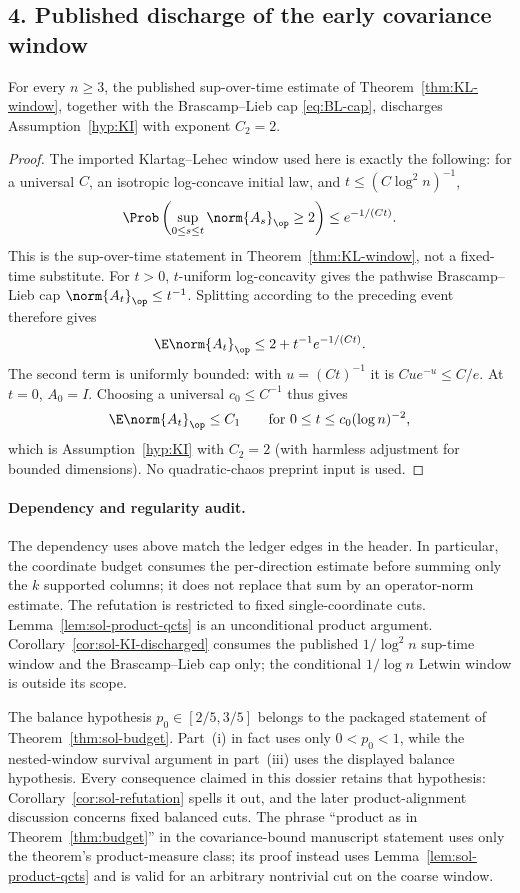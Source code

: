 \documentclass[../main.tex]{subfiles}
\begin{document}
\subsection*{4. Published discharge of the early covariance window}

\begin{corollary}[= Corollary~\ref{cor:KI-discharged}]
\label{cor:sol-KI-discharged}
For every $n\ge3$, the published sup-over-time estimate of
Theorem~\ref{thm:KL-window}, together with the Brascamp--Lieb cap \eqref{eq:BL-cap}, discharges
Assumption~\ref{hyp:KI} with exponent $C_2=2$.
\end{corollary}

\begin{proof}
The imported Klartag--Lehec window \cite[Thm.~61]{KLnotes} used here is exactly the following:
for a universal $C$, an
isotropic log-concave initial law, and
$t\le(C\log^2n)^{-1}$,
\[
  \Prob\left(\sup_{0\le s\le t}\norm{A_s}_\op\ge2\right)
  \le e^{-1/(Ct)}.
\]
This is the sup-over-time statement in Theorem~\ref{thm:KL-window}, not a fixed-time substitute.
For $t>0$, $t$-uniform log-concavity gives the pathwise Brascamp--Lieb cap
$\norm{A_t}_\op\le t^{-1}$.  Splitting according to the preceding event therefore gives
\[
  \E\norm{A_t}_\op
  \le2+t^{-1}e^{-1/(Ct)}.
\]
The second term is uniformly bounded: with $u=(Ct)^{-1}$ it is
$Cu e^{-u}\le C/e$.  At $t=0$, $A_0=I$.  Choosing a universal
$c_0\le C^{-1}$ thus gives
\[
  \E\norm{A_t}_\op\le C_1
  \qquad\text{for }0\le t\le c_0(\log n)^{-2},
\]
which is Assumption~\ref{hyp:KI} with $C_2=2$ (with harmless adjustment for bounded dimensions).
No quadratic-chaos preprint input is used.
\end{proof}

\paragraph{Dependency and regularity audit.}
The dependency uses above match the ledger edges in the header.  In particular, the coordinate
budget consumes the per-direction estimate before summing only the $k$ supported columns; it
does not replace that sum by an operator-norm estimate.  The refutation is restricted to fixed
single-coordinate cuts.  Lemma~\ref{lem:sol-product-qcts} is an unconditional product argument.
Corollary~\ref{cor:sol-KI-discharged} consumes the published $1/\log^2n$ sup-time window and the
Brascamp--Lieb cap only; the conditional $1/\log n$ Letwin window is outside its scope.

The balance hypothesis $p_0\in[2/5,3/5]$ belongs to the packaged statement of
Theorem~\ref{thm:sol-budget}.  Part~(i) in fact uses only $0<p_0<1$, while the nested-window
survival argument in part~(iii) uses the displayed balance hypothesis.  Every consequence
claimed in this dossier retains that hypothesis: Corollary~\ref{cor:sol-refutation} spells it
out, and the later product-alignment discussion concerns fixed balanced cuts.  The phrase
``product as in Theorem~\ref{thm:budget}'' in the covariance-bound manuscript statement uses
only the theorem's product-measure class; its proof instead uses
Lemma~\ref{lem:sol-product-qcts} and is valid for an arbitrary nontrivial cut on the coarse
window.
\end{document}
